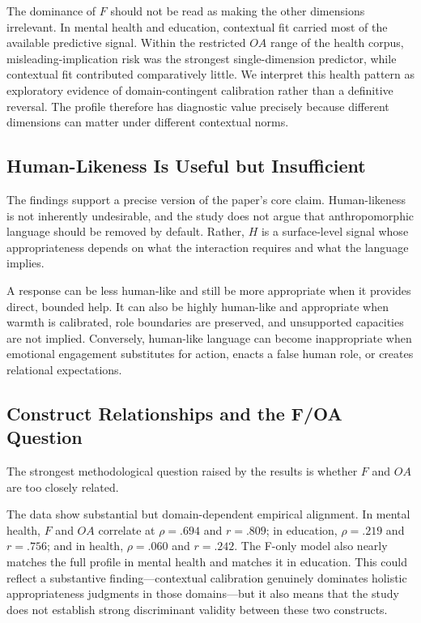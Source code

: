 \documentclass[manuscript,review,anonymous]{acmart}
\begin{document}
The dominance of $F$ should not be read as making the other dimensions irrelevant. In mental health and education, contextual fit carried most of the available predictive signal. Within the restricted $OA$ range of the health corpus, misleading-implication risk was the strongest single-dimension predictor, while contextual fit contributed comparatively little. We interpret this health pattern as exploratory evidence of domain-contingent calibration rather than a definitive reversal. The profile therefore has diagnostic value precisely because different dimensions can matter under different contextual norms.

\subsection{Human-Likeness Is Useful but Insufficient}

The findings support a precise version of the paper's core claim. Human-likeness is not inherently undesirable, and the study does not argue that anthropomorphic language should be removed by default. Rather, $H$ is a surface-level signal whose appropriateness depends on what the interaction requires and what the language implies.

A response can be less human-like and still be more appropriate when it provides direct, bounded help. It can also be highly human-like and appropriate when warmth is calibrated, role boundaries are preserved, and unsupported capacities are not implied. Conversely, human-like language can become inappropriate when emotional engagement substitutes for action, enacts a false human role, or creates relational expectations.

\subsection{Construct Relationships and the F/OA Question}

The strongest methodological question raised by the results is whether $F$ and $OA$ are too closely related.

The data show substantial but domain-dependent empirical alignment. In mental health, $F$ and $OA$ correlate at $\rho=.694$ and $r=.809$; in education, $\rho=.219$ and $r=.756$; and in health, $\rho=.060$ and $r=.242$. The F-only model also nearly matches the full profile in mental health and matches it in education. This could reflect a substantive finding---contextual calibration genuinely dominates holistic appropriateness judgments in those domains---but it also means that the study does not establish strong discriminant validity between these two constructs.
\end{document}
